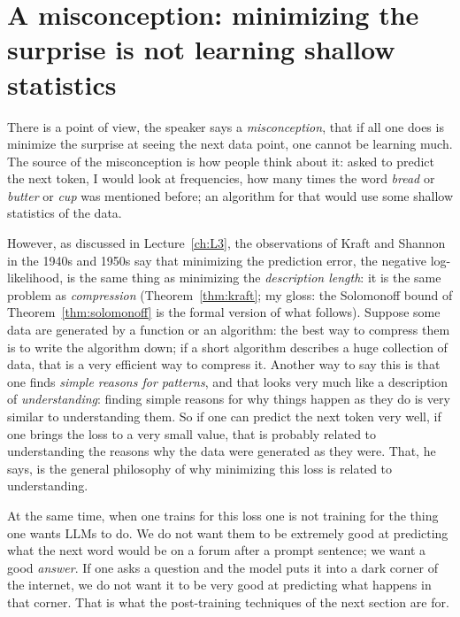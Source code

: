 \section{A misconception: minimizing the surprise is not learning shallow statistics}\label{sec:L6-misconception}
There is a point of view, the speaker says a \emph{misconception}, that if all one does is minimize the surprise at seeing the next data point, one cannot be learning much\flag{}. The source of the misconception is how people think about it: asked to predict the next token, I would look at frequencies, how many times the word \emph{bread} or \emph{butter} or \emph{cup} was mentioned before; an algorithm for that would use some shallow statistics of the data.

However, as discussed in Lecture~\ref{ch:L3}, the observations of Kraft and Shannon in the 1940s and 1950s say that minimizing the prediction error, the negative log-likelihood, is the same thing as minimizing the \emph{description length}: it is the same problem as \emph{compression} (Theorem~\ref{thm:kraft}; my gloss: the Solomonoff bound of Theorem~\ref{thm:solomonoff} is the formal version of what follows). Suppose some data are generated by a function or an algorithm: the best way to compress them is to write the algorithm down; if a short algorithm describes a huge collection of data, that is a very efficient way to compress it. Another way to say this is that one finds \emph{simple reasons for patterns}, and that looks very much like a description of \emph{understanding}: finding simple reasons for why things happen as they do is very similar to understanding them. So if one can predict the next token very well, if one brings the loss to a very small value, that is probably related to understanding the reasons why the data were generated as they were. That, he says, is the general philosophy of why minimizing this loss is related to understanding.

\begin{caution}
At the same time, when one trains for this loss one is not training for the thing one wants LLMs to do. We do not want them to be extremely good at predicting what the next word would be on a forum after a prompt sentence; we want a good \emph{answer}. If one asks a question and the model puts it into a dark corner of the internet, we do not want it to be very good at predicting what happens in that corner. That is what the post-training techniques of the next section are for.
\end{caution}

